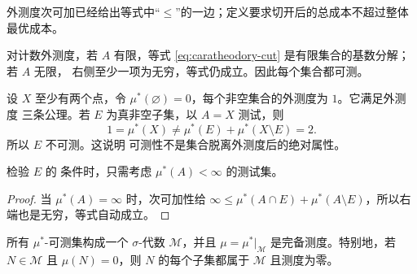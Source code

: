 外测度次可加已经给出等式中“$\le$”的一边；定义要求切开后的总成本不超过整体最优成本。

\begin{example}[可测性依赖外测度]\label{ex:2-1-2-3}
对计数外测度，若 $A$ 有限，等式 \eqref{eq:caratheodory-cut} 是有限集合的基数分解；若 $A$ 无限，
右侧至少一项为无穷，等式仍成立。因此每个集合都可测。
\end{example}

\begin{example}[不是每个外测度都测量所有集合]\label{ex:2-1-2-4}
设 $X$ 至少有两个点，令 $\mu^*(\varnothing)=0$，每个非空集合的外测度为 $1$。它满足外测度
三条公理。若 $E$ 为真非空子集，以 $A=X$ 测试，则
\[
 1=\mu^*(X)\ne\mu^*(E)+\mu^*(X\setminus E)=2.
\]
所以 $E$ 不可测。这说明 \Caratheodory{} 可测性不是集合脱离外测度后的绝对属性。
\end{example}

\begin{proposition}[只需有限成本测试]\label{proposition:2-1-2-4}
检验 $E$ 的 \Caratheodory{} 条件时，只需考虑 $\mu^*(A)<\infty$ 的测试集。
\end{proposition}

\begin{proof}
当 $\mu^*(A)=\infty$ 时，次可加性给
$\infty\le\mu^*(A\cap E)+\mu^*(A\setminus E)$，所以右端也是无穷，等式自动成立。
\end{proof}

\begin{theorem}[\Caratheodory{} 定理]\label{theorem:2-1-2-2}
所有 $\mu^*$-可测集构成一个 $\sigma$-代数 $\mathcal M$，并且
$\mu=\mu^*|_{\mathcal M}$ 是完备测度。特别地，若 $N\in\mathcal M$ 且 $\mu(N)=0$，则
$N$ 的每个子集都属于 $\mathcal M$ 且测度为零。
\end{theorem}

